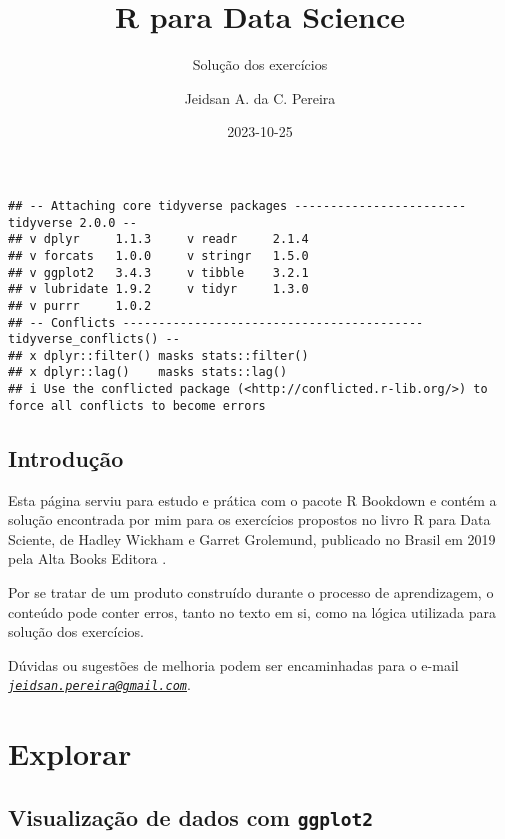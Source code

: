 \documentclass[
]{book}
\title{R para Data Science}
\subtitle{Solução dos exercícios}
\author{Jeidsan A. da C. Pereira}
\date{2023-10-25}
\theoremstyle{definition}
\theoremstyle{definition}
\theoremstyle{definition}
\theoremstyle{definition}
\theoremstyle{remark}
\begin{document}
\maketitle

{
\setcounter{tocdepth}{1}
\tableofcontents
}
\begin{verbatim}
## -- Attaching core tidyverse packages ------------------------ tidyverse 2.0.0 --
## v dplyr     1.1.3     v readr     2.1.4
## v forcats   1.0.0     v stringr   1.5.0
## v ggplot2   3.4.3     v tibble    3.2.1
## v lubridate 1.9.2     v tidyr     1.3.0
## v purrr     1.0.2     
## -- Conflicts ------------------------------------------ tidyverse_conflicts() --
## x dplyr::filter() masks stats::filter()
## x dplyr::lag()    masks stats::lag()
## i Use the conflicted package (<http://conflicted.r-lib.org/>) to force all conflicts to become errors
\end{verbatim}

\hypertarget{introduuxe7uxe3o}{%
\chapter*{Introdução}\label{introduuxe7uxe3o}}

Esta página serviu para estudo e prática com o pacote R Bookdown e contém a solução encontrada por mim para os exercícios propostos no livro R para Data Sciente, de Hadley Wickham e Garret Grolemund, publicado no Brasil em 2019 pela Alta Books Editora \citep{wickham2019}.

Por se tratar de um produto construído durante o processo de aprendizagem, o conteúdo pode conter erros, tanto no texto em si, como na lógica utilizada para solução dos exercícios.

Dúvidas ou sugestões de melhoria podem ser encaminhadas para o e-mail \emph{\href{mailto:jeidsan.pereira@gmail.com}{\nolinkurl{jeidsan.pereira@gmail.com}}}.

\hypertarget{part-explorar}{%
\part{Explorar}\label{part-explorar}}

\hypertarget{visualizauxe7uxe3o-de-dados-com-ggplot2}{%
\chapter{\texorpdfstring{Visualização de dados com \texttt{ggplot2}}{Visualização de dados com ggplot2}}\label{visualizauxe7uxe3o-de-dados-com-ggplot2}}
\end{document}
